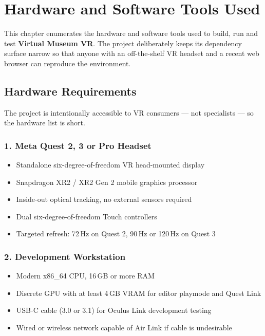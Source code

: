 \chapter{Hardware and Software Tools Used}

This chapter enumerates the hardware and software tools used to build, run and test \textbf{Virtual Museum VR}. The project deliberately keeps its dependency surface narrow so that anyone with an off-the-shelf VR headset and a recent web browser can reproduce the environment.

\section{Hardware Requirements}

The project is intentionally accessible to VR consumers --- not specialists --- so the hardware list is short.

\subsection*{1. Meta Quest 2, 3 or Pro Headset}

\begin{itemize}
\item Standalone six-degree-of-freedom VR head-mounted display
\item Snapdragon XR2 / XR2 Gen 2 mobile graphics processor
\item Inside-out optical tracking, no external sensors required
\item Dual six-degree-of-freedom Touch controllers
\item Targeted refresh: 72\,Hz on Quest 2, 90\,Hz or 120\,Hz on Quest 3
\end{itemize}

\subsection*{2. Development Workstation}

\begin{itemize}
\item Modern x86\_64 CPU, 16\,GB or more RAM
\item Discrete GPU with at least 4\,GB VRAM for editor playmode and Quest Link
\item USB-C cable (3.0 or 3.1) for Oculus Link development testing
\item Wired or wireless network capable of Air Link if cable is undesirable
\end{itemize}

